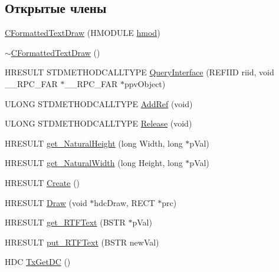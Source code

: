 \subsection*{Открытые члены}
\begin{DoxyCompactItemize}
\item 
\hyperlink{class_c_formatted_text_draw_aeedb5def68e1033d3759b142f48cfb8f}{C\-Formatted\-Text\-Draw} (H\-M\-O\-D\-U\-L\-E \hyperlink{class_c_formatted_text_draw_addc46f2c8df18b9be24193ac2b7bd261}{hmod})
\item 
\hyperlink{class_c_formatted_text_draw_a73cc74e417ded249eb7c8ba5026e74d6}{$\sim$\-C\-Formatted\-Text\-Draw} ()
\item 
H\-R\-E\-S\-U\-L\-T S\-T\-D\-M\-E\-T\-H\-O\-D\-C\-A\-L\-L\-T\-Y\-P\-E \hyperlink{class_c_formatted_text_draw_a94685a982152d40e47bbd38faf3d983d}{Query\-Interface} (R\-E\-F\-I\-I\-D riid, void \-\_\-\-\_\-\-R\-P\-C\-\_\-\-F\-A\-R $\ast$\-\_\-\-\_\-\-R\-P\-C\-\_\-\-F\-A\-R $\ast$ppv\-Object)
\item 
U\-L\-O\-N\-G S\-T\-D\-M\-E\-T\-H\-O\-D\-C\-A\-L\-L\-T\-Y\-P\-E \hyperlink{class_c_formatted_text_draw_adcdbb385f1b4e88c1bdd8f769cc2ea18}{Add\-Ref} (void)
\item 
U\-L\-O\-N\-G S\-T\-D\-M\-E\-T\-H\-O\-D\-C\-A\-L\-L\-T\-Y\-P\-E \hyperlink{class_c_formatted_text_draw_a8c0482c9982ab17a5b1bc16e42dae745}{Release} (void)
\item 
H\-R\-E\-S\-U\-L\-T \hyperlink{class_c_formatted_text_draw_a1b9dc72357c06a06f294d2e07bca4a18}{get\-\_\-\-Natural\-Height} (long Width, long $\ast$p\-Val)
\item 
H\-R\-E\-S\-U\-L\-T \hyperlink{class_c_formatted_text_draw_aa69166f66353dec9dc28b1e2e6f4c495}{get\-\_\-\-Natural\-Width} (long Height, long $\ast$p\-Val)
\item 
H\-R\-E\-S\-U\-L\-T \hyperlink{class_c_formatted_text_draw_aeda21fe76e87d85c6e6ae97f6d98c82c}{Create} ()
\item 
H\-R\-E\-S\-U\-L\-T \hyperlink{class_c_formatted_text_draw_aa9d8d11773fb62728bbee88d441edfcf}{Draw} (void $\ast$hdc\-Draw, R\-E\-C\-T $\ast$prc)
\item 
H\-R\-E\-S\-U\-L\-T \hyperlink{class_c_formatted_text_draw_ae319a9932c1a75ad19619bea99acb2df}{get\-\_\-\-R\-T\-F\-Text} (B\-S\-T\-R $\ast$p\-Val)
\item 
H\-R\-E\-S\-U\-L\-T \hyperlink{class_c_formatted_text_draw_aa8f8860ff9c0d5e1dacee5023743256f}{put\-\_\-\-R\-T\-F\-Text} (B\-S\-T\-R new\-Val)
\item 
H\-D\-C \hyperlink{class_c_formatted_text_draw_a82e2088a0416fc8a2d0039e97108ef6b}{Tx\-Get\-D\-C} ()

\end{DoxyCompactItemize}
